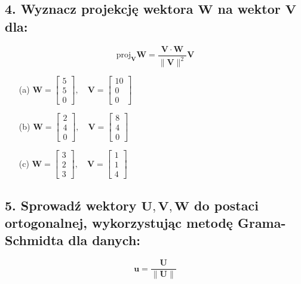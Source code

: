 \subsection*{4. Wyznacz projekcję wektora $\mathbf{W}$ na wektor $\mathbf{V}$ dla:}

\[
\text{proj}_{\mathbf{V}} \mathbf{W} = \frac{\mathbf{V} \cdot \mathbf{W}}{\|\mathbf{V}\|^2} \mathbf{V}
\]


\begin{enumerate}
    \item[(a)] $\mathbf{W} = \begin{bmatrix} 5 \\ 5 \\ 0 \end{bmatrix}, \quad
    \mathbf{V} = \begin{bmatrix} 10 \\ 0 \\ 0 \end{bmatrix}$
    
    \item[(b)] $\mathbf{W} = \begin{bmatrix} 2 \\ 4 \\ 0 \end{bmatrix}, \quad
    \mathbf{V} = \begin{bmatrix} 8 \\ 4 \\ 0 \end{bmatrix}$
    
    \item[(c)] $\mathbf{W} = \begin{bmatrix} 3 \\ 2 \\ 3 \end{bmatrix}, \quad
    \mathbf{V} = \begin{bmatrix} 1 \\ 1 \\ 4 \end{bmatrix}$
\end{enumerate}




\subsection*{5. Sprowadź wektory $\mathbf{U}, \mathbf{V}, \mathbf{W}$ do postaci ortogonalnej, wykorzystując metodę Grama-Schmidta dla danych:}

\[
\mathbf{u} = \frac{\mathbf{U}}{\|\mathbf{U}\|}
\]

